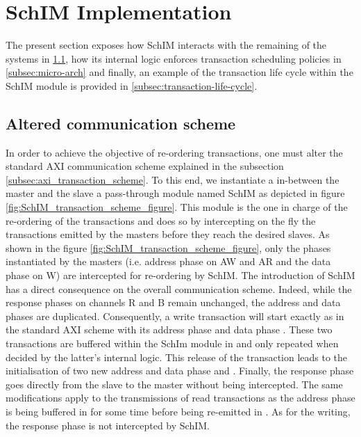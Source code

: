 \section{SchIM Implementation}
    \label{sec:schim_implmentation}

    The present section exposes how SchIM interacts with the remaining of the systems in \ref{subsec:communication-scheme}, how its internal logic enforces transaction scheduling policies in \ref{subsec:micro-arch} and finally, an example of the transaction life cycle within the SchIM module is provided in \ref{subsec:transaction-life-cycle}.

    
    \subsection{Altered communication scheme}
        \label{subsec:communication-scheme}
        In order to achieve the objective of re-ordering transactions, one must alter the standard AXI communication scheme explained in the subsection \ref{subsec:axi_transaction_scheme}.
        To this end, we instantiate a in-between the master and the slave a pass-through module named SchIM as depicted in figure \ref{fig:SchIM_transaction_scheme_figure}.
        This module is the one in charge of the re-ordering of the transactions and does so by intercepting on the fly the transactions emitted by the masters before they reach the desired slaves.
        As shown in the figure \ref{fig:SchIM_transaction_scheme_figure}, only the phases instantiated by the masters (i.e. address phase on AW and AR and the data phase on W) are intercepted for re-ordering by SchIM.
        The introduction of SchIM has a direct consequence on the overall communication scheme. Indeed, while the response phases on channels R and B remain unchanged, the address and data phases are duplicated.
        Consequently, a write transaction will start exactly as in the standard AXI scheme with its address phase  and data phase .
        These two transactions are buffered within the SchIm module in  and only repeated when decided by the latter's internal logic.
        This release of the transaction leads to the initialisation of two new address and data phase  and .
        Finally, the response phase  goes directly from the slave to the master without being intercepted.
        The same modifications apply to the transmissions of read transactions as the address phase  is being buffered in  for some time before being re-emitted in .
        As for the writing, the response phase  is not intercepted by SchIM.

